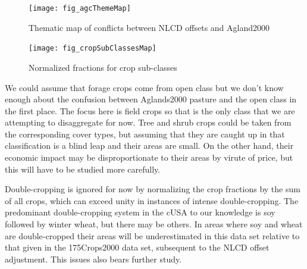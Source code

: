 \begin{figure}[hpt] 
  \begin{center} 


    \texttt{[image: fig\_agcThemeMap]}
  \end{center} 
  \caption{Thematic map of conflicts between NLCD offsets and Agland2000}
  \label{fig:agcThemeMap} 
\end{figure} 





\begin{figure}[hpt] 
  \begin{center} 

    \texttt{[image: fig\_cropSubClassesMap]}
  \end{center} 
  \caption{Normalized fractions for crop sub-classes}
  \label{fig:cropSubClassesMap} 
\end{figure} 


We could assume that forage crops come from open class but we don't
know enough about the confusion between Aglands2000 pasture and the
open class in the first place.  The focus here is field crops so that
is the only class that we are attempting to disaggregate for now.
Tree and shrub crops could be taken from the corresponding cover
types, but assuming that they are caught up in that classification is
a blind leap and their areas are small.  On the other hand, their
economic impact may be disproportionate to their areas by virute of
price, but this will have to be studied more carefully.

Double-cropping is ignored for now by normalizing the crop fractions
by the sum of all crops, which can exceed unity in instances of
intense double-cropping.  The predominant double-cropping system in
the cUSA to our knowledge is soy followed by winter wheat, but there
may be others.  In areas where soy and wheat are double-cropped their
areas will be underestimated in this data set relative to that given
in the 175Crops2000 data set, subsequent to the NLCD offset
adjustment.  This issues also bears further study.




